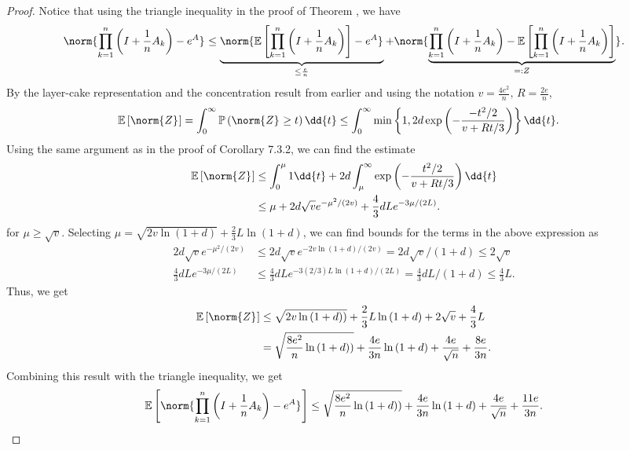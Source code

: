 \begin{proof}
    Notice that using the triangle inequality in the proof of Theorem \label{worstcaseexp}, we have 
    \[ \norm{\prod_{k=1}^{n} \left(I+\frac{1}{n}A_k\right)-e^{A}}_{} \leq \underbrace{\norm{\mathbb{E}\left[ \prod_{k=1}^{n}\left(I+\frac{1}{n}A_k\right)\right]-e^{A}}_{}}_{\leq \frac{e}{n}}+ \norm{\underbrace{\prod_{k=1}^{n} \left(I+\frac{1}{n}A_k\right)-\mathbb{E}\left[\prod_{k=1}^{n} \left(I+\frac{1}{n}A_k\right)\right]}_{=:Z}}_{}. \]
    By the layer-cake representation and the concentration result from earlier and using the notation \( v= \frac{4e^{2}}{n},\, R= \frac{2e}{n} \), 
    \begin{align*}
      \mathbb{E}\left[\norm{Z}_{}\right] & = \int_{0}^{\infty } \mathbb{P}\left(\norm{Z}_{} \geq t\right) \dd{t} \leq \int_{0}^{\infty } \min_{} \left\{ 1, 2d \exp \left(- \frac{-t^2/2}{v+Rt/3}\right)\right\} \dd{t}.
    \end{align*}
    Using the same argument as \cite{tropp2015introduction} in the proof of Corollary 7.3.2, we can find the estimate 
   \begin{align*}
     \mathbb{E}\left[\norm{Z}_{}\right] &\leq \int_{0}^{\mu} 1 \dd{t}+ 2d \int_{\mu }^{\infty } \exp \left(- \frac{t^2/2}{v+Rt/3}\right) \dd{t}  \\
                                        & \leq \mu + 2d \sqrt{v} e^{- \mu^{2}/(2v)} + \frac{4}{3}d L e^{-3\mu/(2L)}.
   \end{align*}
   for \( \mu \geq \sqrt{v} \).
   Selecting \( \mu= \sqrt{2v \operatorname{ln}\left(1+d\right)}+ \frac{2}{3} L \operatorname{ln}\left(1+d\right) \), we can find bounds for the terms in the above expression as 
   \begin{align*}
     2d \sqrt{v} e^{-\mu^2/(2v)} & \leq 2d \sqrt{v} e^{-2v \operatorname{ln}\left(1+d\right)/(2v)} = 2d \sqrt{v} /(1+d) \leq 2 \sqrt{v} \\
     \frac{4}{3}d L e^{-3\mu/(2L)} &\leq \frac{4}{3} dL e^{-3(2/3)L \operatorname{ln}\left(1+d\right)/(2L)} = \frac{4}{3}dL/(1+d) \leq \frac{4}{3}L.
   \end{align*}
   Thus, we get 
   \begin{align*} 
     \mathbb{E}\left[\norm{Z}_{}\right] &\leq \sqrt{2v \operatorname{ln}\left(1+d)\right)} + \frac{2}{3}L\operatorname{ln}\left(1+d\right) + 2 \sqrt{v} + \frac{4}{3}L  \\
                                        &= \sqrt{\frac{8e^{2}}{n}\operatorname{ln}\left(1+d)\right)} + \frac{4e}{3n}\operatorname{ln}\left(1+d\right) + \frac{4e}{\sqrt{n}}+\frac{8e}{3n}.
 \end{align*}
Combining this result with the triangle inequality, we get
\[\mathbb{E}\left[\norm{\prod_{k=1}^{n} \left(I+\frac{1}{n} A_k\right)-e^{A}}_{}\right] \leq \sqrt{\frac{8e^{2}}{n}\operatorname{ln}\left(1+d)\right)} + \frac{4e}{3n}\operatorname{ln}\left(1+d\right) + \frac{4e}{\sqrt{n}}+\frac{11e}{3n}.\]
\end{proof}




